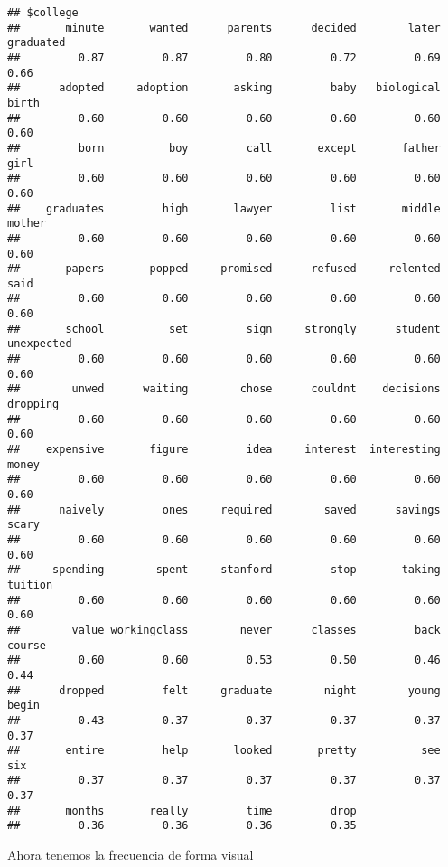\documentclass[
]{article}
\newenvironment{Shaded}{\begin{snugshade}}{\end{snugshade}}
\newcommand{\AttributeTok}[1]{\textcolor[rgb]{0.77,0.63,0.00}{#1}}
\newcommand{\CommentTok}[1]{\textcolor[rgb]{0.56,0.35,0.01}{\textit{#1}}}
\newcommand{\DecValTok}[1]{\textcolor[rgb]{0.00,0.00,0.81}{#1}}
\newcommand{\FunctionTok}[1]{\textcolor[rgb]{0.00,0.00,0.00}{#1}}
\newcommand{\NormalTok}[1]{#1}
\newcommand{\OtherTok}[1]{\textcolor[rgb]{0.56,0.35,0.01}{#1}}
\newcommand{\SpecialCharTok}[1]{\textcolor[rgb]{0.00,0.00,0.00}{#1}}
\newcommand{\StringTok}[1]{\textcolor[rgb]{0.31,0.60,0.02}{#1}}
\begin{document}
\begin{verbatim}
## $college
##       minute       wanted      parents      decided        later    graduated 
##         0.87         0.87         0.80         0.72         0.69         0.66 
##      adopted     adoption       asking         baby   biological        birth 
##         0.60         0.60         0.60         0.60         0.60         0.60 
##         born          boy         call       except       father         girl 
##         0.60         0.60         0.60         0.60         0.60         0.60 
##    graduates         high       lawyer         list       middle       mother 
##         0.60         0.60         0.60         0.60         0.60         0.60 
##       papers       popped     promised      refused     relented         said 
##         0.60         0.60         0.60         0.60         0.60         0.60 
##       school          set         sign     strongly      student   unexpected 
##         0.60         0.60         0.60         0.60         0.60         0.60 
##        unwed      waiting        chose      couldnt    decisions     dropping 
##         0.60         0.60         0.60         0.60         0.60         0.60 
##    expensive       figure         idea     interest  interesting        money 
##         0.60         0.60         0.60         0.60         0.60         0.60 
##      naively         ones     required        saved      savings        scary 
##         0.60         0.60         0.60         0.60         0.60         0.60 
##     spending        spent     stanford         stop       taking      tuition 
##         0.60         0.60         0.60         0.60         0.60         0.60 
##        value workingclass        never      classes         back       course 
##         0.60         0.60         0.53         0.50         0.46         0.44 
##      dropped         felt     graduate        night        young        begin 
##         0.43         0.37         0.37         0.37         0.37         0.37 
##       entire         help       looked       pretty          see          six 
##         0.37         0.37         0.37         0.37         0.37         0.37 
##       months       really         time         drop 
##         0.36         0.36         0.36         0.35
\end{verbatim}

Ahora tenemos la frecuencia de forma visual

\begin{Shaded}
\end{Shaded}
\end{document}
